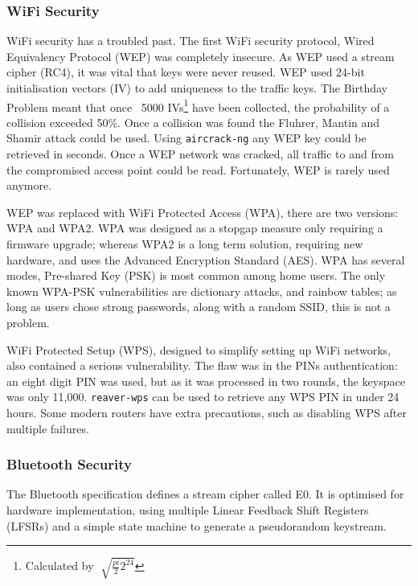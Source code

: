 \documentclass[10pt,journal,compsoc]{IEEEtran}
\begin{document}
\subsubsection{WiFi Security}
WiFi security has a troubled past. The first WiFi security protocol, Wired
Equivalency Protocol (WEP) was completely insecure. As WEP used a stream cipher
(RC4), it was vital that keys were never reused. WEP used 24-bit initialisation
vectors (IV) to add uniqueness to the traffic keys. The Birthday Problem meant
that once ~5000 IVs\footnote{Calculated by $\sqrt[]{\frac{pi}{2} 2^{24}} $}
have been collected, the probability of a collision exceeded 50\%. Once a
collision was found the Fluhrer, Mantin and Shamir attack could be used. Using
{\tt aircrack-ng} any WEP key could be retrieved in seconds. Once a WEP network
was cracked, all traffic to and from the compromised access point could be
read. Fortunately, WEP is rarely used anymore.

WEP was replaced with WiFi Protected Access (WPA), there are two versions: WPA
and WPA2. WPA was designed as a stopgap measure only requiring a firmware
upgrade; whereas WPA2 is a long term solution, requiring new hardware, and uses
the Advanced Encryption Standard (AES). WPA has several modes, Pre-shared Key
(PSK) is most common among home users. The only known WPA-PSK vulnerabilities
are dictionary attacks, and rainbow tables; as long as users chose strong
passwords, along with a random SSID, this is not a problem. 

WiFi Protected Setup (WPS), designed to simplify setting up WiFi networks, also
contained a serious vulnerability. The flaw was in the PINs authentication: an
eight digit PIN was used, but as it was processed in two rounds, the keyspace
was only 11,000. {\tt reaver-wps} can be used to retrieve any WPS PIN in under
24 hours. Some modern routers have extra precautions, such as disabling WPS
after multiple failures. 

\subsubsection{Bluetooth Security}
The Bluetooth specification \cite{BTSpec} defines a stream cipher called E0.
It is optimised for  hardware implementation, using multiple Linear Feedback
Shift Registers (LFSRs) and a simple state machine to generate a pseudorandom
keystream. 
\end{document}
